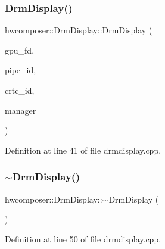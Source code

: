 \subsubsection{\texorpdfstring{Drm\+Display()}{DrmDisplay()}}
{\footnotesize\ttfamily hwcomposer\+::\+Drm\+Display\+::\+Drm\+Display (\begin{DoxyParamCaption}\item[{uint32\+\_\+t}]{gpu\+\_\+fd,  }\item[{uint32\+\_\+t}]{pipe\+\_\+id,  }\item[{uint32\+\_\+t}]{crtc\+\_\+id,  }\item[{\mbox{\hyperlink{classhwcomposer_1_1DrmDisplayManager}{Drm\+Display\+Manager}} $\ast$}]{manager }\end{DoxyParamCaption})}



Definition at line 41 of file drmdisplay.\+cpp.


\begin{DoxyCode}{0}
\end{DoxyCode}
\mbox{\label{classhwcomposer_1_1DrmDisplay_a10adc5ea0028976604fa467efcfb1880}} 
\subsubsection{\texorpdfstring{$\sim$\+Drm\+Display()}{~DrmDisplay()}}
{\footnotesize\ttfamily hwcomposer\+::\+Drm\+Display\+::$\sim$\+Drm\+Display (\begin{DoxyParamCaption}{ }\end{DoxyParamCaption})\hspace{0.3cm}{\ttfamily [override]}}



Definition at line 50 of file drmdisplay.\+cpp.


